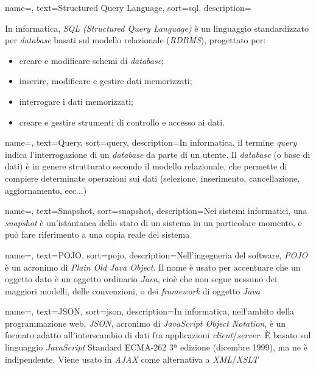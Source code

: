 {
    name=,
    text=Structured Query Language,
    sort=sql,
    description={In informatica, \textit{SQL (Structured Query Language)} è un linguaggio standardizzato per \textit{database} basati sul modello relazionale (\textit{RDBMS}), progettato per:
    \begin{itemize}
    	\item{creare e modificare schemi di \textit{database};}
    	\item{inserire, modificare e gestire dati memorizzati;}
    	\item{interrogare i dati memorizzati;}
    	\item{creare e gestire strumenti di controllo e accesso ai dati.}
    \end{itemize}
    }
}

{
    name=,
    text=Query,
    sort=query,
    description={In informatica, il termine \textit{query} indica l'interrogazione di un \textit{database} da parte di un utente. Il \textit{database} (o base di dati) è in genere strutturato secondo il modello relazionale, che permette di compiere determinate operazioni sui dati (selezione, inserimento, cancellazione, aggiornamento, ecc...)}
}

{
    name=,
    text=Snapshot,
    sort=snapshot,
    description={Nei sistemi informatici, una \textit{snapshot} è un'istantanea dello stato di un sistema in un particolare momento, e può fare riferimento a una copia reale del sistema}
}

{
    name=,
    text=POJO,
    sort=pojo,
    description={Nell'ingegneria del software, \textit{POJO} è un acronimo di \textit{Plain Old Java Object}. Il nome è usato per accentuare che un oggetto dato è un oggetto ordinario \textit{Java}, cioè che non segue nessuno dei maggiori modelli, delle convenzioni, o dei \textit{\textit{\gls{framework}}} di oggetto \textit{Java}}
}

{
    name=,
    text=JSON,
    sort=json,
    description={In informatica, nell'ambito della programmazione web, \textit{JSON}, acronimo di \textit{JavaScript Object Notation}, è un formato adatto all'interscambio di dati fra applicazioni \textit{client}/\textit{server}.
È basato sul linguaggio \textit{JavaScript} Standard ECMA-262 3ª edizione (dicembre 1999), ma ne è indipendente. Viene usato in \textit{AJAX} come alternativa a \textit{XML}/\textit{XSLT}
}
}

